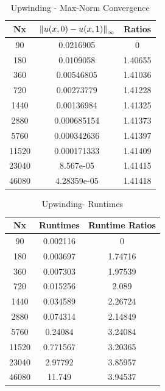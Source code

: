 \documentclass[12pt]{article}
\begin{document}
\begin{enumerate}[(a)]
\begin{minipage}{0.5\textwidth}
\begin{table}[H]
\caption{Upwinding - Max-Norm Convergence}
\centering\begin{tabular}{||c|cc||}
\hline \hline
    Nx &   $\norm{u(x,0)-u(x,1)}_\infty$ &   Ratios \\
\hline
    90 &      0.0216905   &  0       \\
   180 &      0.0109058   &  1.40655 \\
   360 &      0.00546805  &  1.41036 \\
   720 &      0.00273779  &  1.41228 \\
  1440 &      0.00136984  &  1.41325 \\
  2880 &      0.000685154 &  1.41373 \\
  5760 &      0.000342636 &  1.41397 \\
 11520 &      0.000171333 &  1.41409 \\
 23040 &      8.567e-05   &  1.41415 \\
 46080 &      4.28359e-05 &  1.41418 \\
\hline \hline
\end{tabular}
\end{table}
\end{minipage}%
\begin{minipage}{0.5\textwidth}
\begin{table}[H]
\caption{Upwinding- Runtimes}
\centering\begin{tabular}{||c|cc||}
\hline \hline
    Nx &   Runtimes &   Runtime Ratios \\
\hline
    90 &   0.002116 &          0       \\
   180 &   0.003697 &          1.74716 \\
   360 &   0.007303 &          1.97539 \\
   720 &   0.015256 &          2.089   \\
  1440 &   0.034589 &          2.26724 \\
  2880 &   0.074314 &          2.14849 \\
  5760 &   0.24084  &          3.24084 \\
 11520 &   0.771567 &          3.20365 \\
 23040 &   2.97792  &          3.85957 \\
 46080 &  11.749    &          3.94537 \\
\hline
\end{tabular}\end{table}\end{minipage} \\

\end{enumerate}
\end{document}
